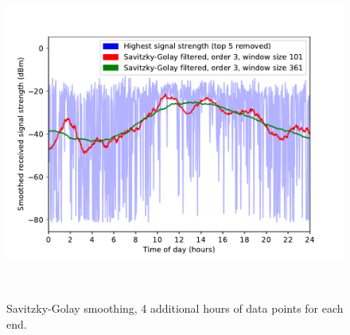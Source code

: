 \documentclass[a4paper, 11pt]{article}
\begin{document}
\begin{figure}[htbp]
\begin{minipage}[t]{0.45\textwidth}
\centering
\includegraphics[width=\textwidth]{savitzky_4hours}
\caption{Savitzky-Golay smoothing, 4 additional hours of data points for each end.}
\label{savitzky_4}
\end{minipage}\
\end{figure}
\end{document}
